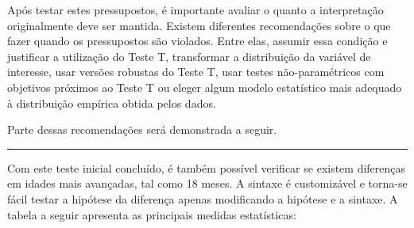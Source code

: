 \documentclass[
]{book}
\newenvironment{Shaded}{\begin{snugshade}}{\end{snugshade}}
\newcommand{\DataTypeTok}[1]{\textcolor[rgb]{0.13,0.29,0.53}{#1}}
\newcommand{\DecValTok}[1]{\textcolor[rgb]{0.00,0.00,0.81}{#1}}
\newcommand{\KeywordTok}[1]{\textcolor[rgb]{0.13,0.29,0.53}{\textbf{#1}}}
\newcommand{\NormalTok}[1]{#1}
\newcommand{\OperatorTok}[1]{\textcolor[rgb]{0.81,0.36,0.00}{\textbf{#1}}}
\newcommand{\StringTok}[1]{\textcolor[rgb]{0.31,0.60,0.02}{#1}}
\begin{document}
Após testar estes pressupostos, é importante avaliar o quanto a interpretação originalmente deve ser mantida. Existem diferentes recomendações sobre o que fazer quando os pressupostos são violados. Entre elas, assumir essa condição e justificar a utilização do Teste T, transformar a distribuição da variável de interesse, usar versões robustas do Teste T, usar testes não-paramétricos com objetivos próximos ao Teste T ou eleger algum modelo estatístico mais adequado à distribuição empírica obtida pelos dados.

Parte dessas recomendações será demonstrada a seguir.

\begin{center}\rule{0.5\linewidth}{0.5pt}\end{center}

Com este teste inicial concluído, é também possível verificar se existem diferenças em idades mais avançadas, tal como 18 meses. A sintaxe é customizável e torna-se fácil testar a hipótese da diferença apenas modificando a hipótese e a sintaxe. A tabela a seguir apresenta as principais medidas estatísticas:

\begin{Shaded}
\end{Shaded}
\end{document}
